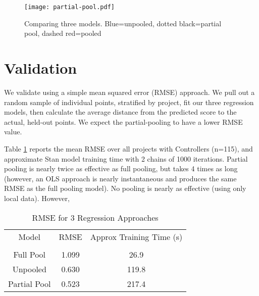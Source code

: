 \documentclass[sigconf,natbib=false]{acmart}
\begin{document}
\begin{figure*}[tb]
	\centering
	\texttt{[image: partial-pool.pdf]}
	\caption{Comparing three models. Blue=unpooled, dotted black=partial pool, dashed red=pooled}
	\label{fig:partial-pool}
\end{figure*}

\section{Validation}

We validate using a simple mean squared error (RMSE) approach.%
We pull out a random sample of individual points, stratified by project, fit our three regression models, then calculate the average distance from the predicted score to the actual, held-out points. We expect the partial-pooling to have a lower RMSE value.

Table \ref{tbl:rmse} reports the mean RMSE over all projects with Controllers (n=115), and approximate Stan model training time with 2 chains of 1000 iterations. Partial pooling is nearly twice as effective as full pooling, but takes 4 times as long (however, an OLS approach is nearly instantaneous and produces the same RMSE as the full pooling model). No pooling is nearly as effective (using only local data). However, 

\begin{table}
\begin{tabular}{c|c|c}
Model & RMSE & Approx Training Time (s) \\ \\
Full Pool & 1.099 & 26.9 \\
Unpooled & 0.630 & 119.8 \\
Partial Pool & 0.523 & 217.4 \\

\end{tabular}
\label{tbl:rmse}
\caption{RMSE for 3 Regression Approaches}
\end{table}
\end{document}
